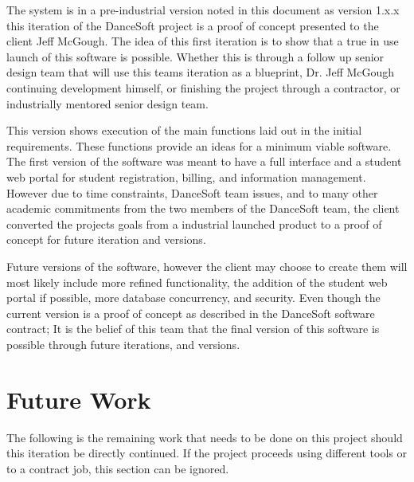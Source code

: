 The system is in a pre-industrial version noted in this document as version 1.x.x this iteration of the DanceSoft project is a proof of concept presented to the client Jeff McGough. The idea of this first iteration is to show that a true in use launch of this software is possible. Whether this is through a follow up senior design team that will use this teams iteration as a blueprint, Dr. Jeff McGough continuing development himself, or finishing the project through a contractor, or industrially mentored senior design team.

This version shows execution of the main functions laid out in the initial requirements. These functions provide an ideas for a minimum viable software. The first version of the software was meant to have a full interface and a student web portal for student registration, billing, and information management. However due to time constraints, DanceSoft team issues, and to many other academic commitments from the two members of the DanceSoft team, the client converted the projects goals from a industrial launched product to a proof of concept for future iteration and versions. 

Future versions of the software, however the client may choose to create them will most likely include more refined functionality, the addition of the student web portal if possible, more database concurrency, and security. Even though the current version is a proof of concept as described in the DanceSoft software contract; It is the belief of this team that the final version of this software is possible through future iterations, and versions.


\section{Future Work}
The following is the remaining work that needs to be done on this project should this iteration be directly continued. If the project proceeds using different tools or to a contract job, this section can be ignored.

